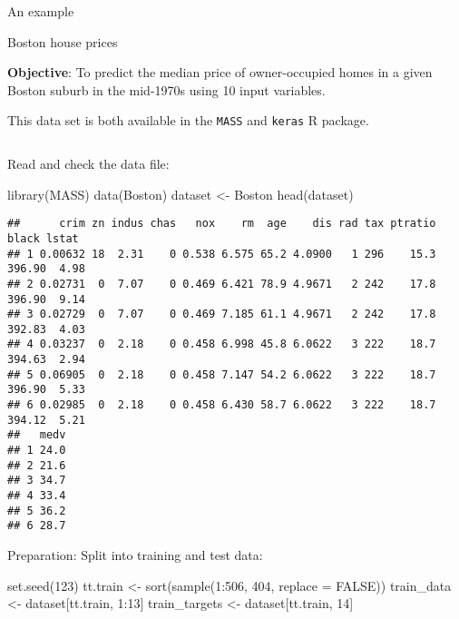 \documentclass[
  10pt,
  ignorenonframetext,
]{beamer}
\newenvironment{Shaded}{\begin{snugshade}}{\end{snugshade}}
\newcommand{\AttributeTok}[1]{\textcolor[rgb]{0.77,0.63,0.00}{#1}}
\newcommand{\ConstantTok}[1]{\textcolor[rgb]{0.00,0.00,0.00}{#1}}
\newcommand{\DecValTok}[1]{\textcolor[rgb]{0.00,0.00,0.81}{#1}}
\newcommand{\FunctionTok}[1]{\textcolor[rgb]{0.00,0.00,0.00}{#1}}
\newcommand{\NormalTok}[1]{#1}
\newcommand{\OtherTok}[1]{\textcolor[rgb]{0.56,0.35,0.01}{#1}}
\newcommand{\SpecialCharTok}[1]{\textcolor[rgb]{0.00,0.00,0.00}{#1}}
\begin{document}
\begin{frame}[fragile]{An example}
\protect\hypertarget{an-example}{}
\begin{block}{Boston house prices}
\protect\hypertarget{boston-house-prices}{}
\vspace{2mm}

\textbf{Objective}: To predict the median price of owner-occupied homes
in a given Boston suburb in the mid-1970s using 10 input variables.

This data set is both available in the \texttt{MASS} and \texttt{keras}
R package.

\(~\)
\end{block}
\end{frame}

\begin{frame}[fragile]
Read and check the data file:

\scriptsize

\begin{Shaded}
\begin{Highlighting}[]
\FunctionTok{library}\NormalTok{(MASS)}
\FunctionTok{data}\NormalTok{(Boston)}
\NormalTok{dataset }\OtherTok{\textless{}{-}}\NormalTok{ Boston}
\FunctionTok{head}\NormalTok{(dataset)}
\end{Highlighting}
\end{Shaded}

\begin{verbatim}
##      crim zn indus chas   nox    rm  age    dis rad tax ptratio  black lstat
## 1 0.00632 18  2.31    0 0.538 6.575 65.2 4.0900   1 296    15.3 396.90  4.98
## 2 0.02731  0  7.07    0 0.469 6.421 78.9 4.9671   2 242    17.8 396.90  9.14
## 3 0.02729  0  7.07    0 0.469 7.185 61.1 4.9671   2 242    17.8 392.83  4.03
## 4 0.03237  0  2.18    0 0.458 6.998 45.8 6.0622   3 222    18.7 394.63  2.94
## 5 0.06905  0  2.18    0 0.458 7.147 54.2 6.0622   3 222    18.7 396.90  5.33
## 6 0.02985  0  2.18    0 0.458 6.430 58.7 6.0622   3 222    18.7 394.12  5.21
##   medv
## 1 24.0
## 2 21.6
## 3 34.7
## 4 33.4
## 5 36.2
## 6 28.7
\end{verbatim}

\normalsize

Preparation: Split into training and test data:

\scriptsize

\begin{Shaded}
\begin{Highlighting}[]
\FunctionTok{set.seed}\NormalTok{(}\DecValTok{123}\NormalTok{)}
\NormalTok{tt.train }\OtherTok{\textless{}{-}} \FunctionTok{sort}\NormalTok{(}\FunctionTok{sample}\NormalTok{(}\DecValTok{1}\SpecialCharTok{:}\DecValTok{506}\NormalTok{, }\DecValTok{404}\NormalTok{, }\AttributeTok{replace =} \ConstantTok{FALSE}\NormalTok{))}
\NormalTok{train\_data }\OtherTok{\textless{}{-}}\NormalTok{ dataset[tt.train, }\DecValTok{1}\SpecialCharTok{:}\DecValTok{13}\NormalTok{]}
\NormalTok{train\_targets }\OtherTok{\textless{}{-}}\NormalTok{ dataset[tt.train, }\DecValTok{14}\NormalTok{]}


\end{Highlighting}
\end{Shaded}
\end{frame}
\end{document}
